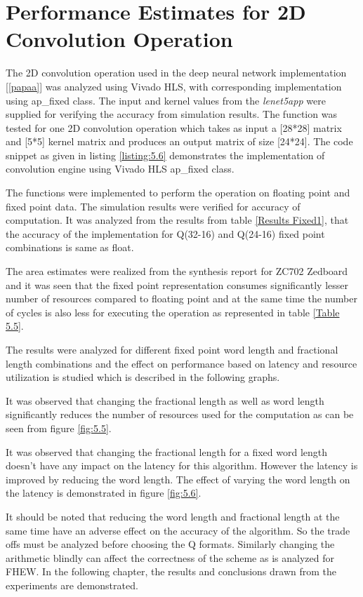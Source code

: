 \section{Performance Estimates for 2D Convolution Operation}
The 2D convolution operation used in the deep neural network implementation [\ref{papaa}] was analyzed using Vivado HLS, with corresponding implementation using ap\_fixed class.
The input and kernel values from the \textit{lenet5app} were supplied for verifying the accuracy from simulation results. The function was tested for one 2D convolution operation which takes as input a [28*28] matrix and [5*5] kernel matrix and produces an output matrix of size [24*24].
 The code snippet as given in listing \ref{listing:5.6} demonstrates the implementation of convolution engine using Vivado HLS ap\_fixed class.

\noindent The functions were implemented to perform the operation on floating point and fixed point data. The simulation results were verified for accuracy of computation. It was analyzed from the results from table \ref{Results Fixed1}, that the accuracy of the implementation for Q(32-16) and Q(24-16) fixed point combinations is same as float.

\noindent The area estimates were realized from the synthesis report for ZC702 Zedboard and it was seen that the fixed point representation consumes significantly lesser number of resources compared to floating point and at the same time the number of cycles is also less for executing the operation as represented in table \ref{Table 5.5}.


\noindent The results were analyzed for different fixed point word length and fractional length combinations and the effect on performance based on latency and resource utilization is studied which is described in the following graphs.



\noindent It was observed that changing the fractional length as well as word length significantly reduces the number of resources used for the computation as can be seen from figure \ref{fig:5.5}.


\noindent It was observed that changing the fractional length for a fixed word length doesn't have any impact on the latency for this algorithm. However the latency is improved by reducing the word length. The effect of varying the word length on the latency is demonstrated in figure \ref{fig:5.6}.

\noindent It should be noted that reducing the word length and fractional length at the same time have an adverse effect on the accuracy of the algorithm. So the trade offs must be analyzed before choosing the Q formats. Similarly changing the arithmetic blindly can affect the correctness of the scheme as is analyzed for FHEW. In the following chapter, the results and conclusions drawn from the experiments are demonstrated. 